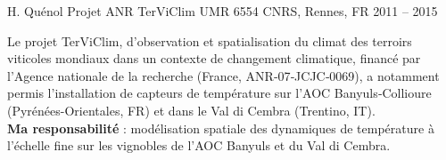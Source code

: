 \begin{cventries}
\cventry
{H. Quénol} %
{Projet ANR TerViClim} %
{UMR 6554 CNRS, Rennes, FR} %
{2011 -- 2015} %
{
  \begin{cvitems} %
    Le projet TerViClim, d’observation et spatialisation du climat des terroirs viticoles mondiaux dans un contexte de changement climatique, financé par l’Agence nationale de la recherche (France, ANR‑07‑JCJC‑0069), a notamment permis l’installation de capteurs de température sur l’AOC Banyuls‑Collioure (Pyrénées-Orientales, FR) et dans le Val di Cembra (Trentino, IT).\\
    \textbf{Ma responsabilité } : modélisation spatiale des dynamiques de température à l'échelle fine sur les vignobles de l'AOC Banyuls et du Val di Cembra.
  \end{cvitems}
}


\end{cventries}

